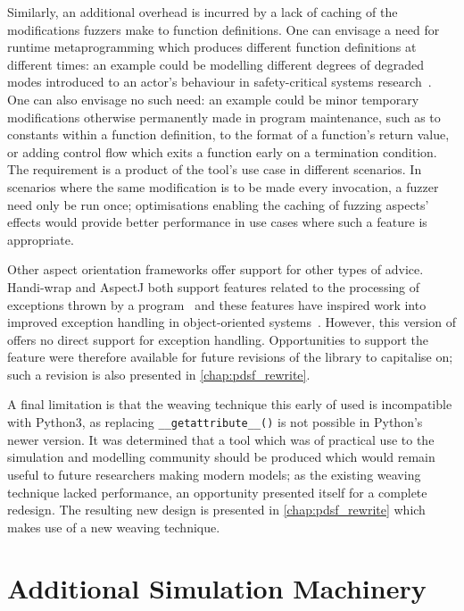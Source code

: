 Similarly, an additional overhead is incurred by a lack of caching of the
modifications fuzzers make to function definitions. One can envisage a need for
runtime metaprogramming which produces different function definitions at
different times: an example could be modelling different degrees of degraded
modes introduced to an actor's behaviour in safety-critical systems
research~\cite{johnson2007degradedmodes}. One can also envisage no such need: an
example could be minor temporary modifications otherwise permanently made in
program maintenance, such as to constants within a function definition, to the
format of a function's return value, or adding control flow which exits a
function early on a termination condition. The requirement is a product of the
tool's use case in different scenarios. In scenarios where the same modification
is to be made every invocation, a fuzzer need only be run once; optimisations
enabling the caching of fuzzing aspects' effects would provide better
performance in use cases where such a feature is appropriate.

Other aspect orientation frameworks offer support for other types of advice.
Handi-wrap and AspectJ both support features related to the processing of
exceptions thrown by a program~\cite{Baker_2002,aspectj_intro} and these
features have inspired work into improved exception handling in object-oriented
systems~\cite{millham2011aopandoopsecurity}. However, this version of \pdsf
offers no direct support for exception handling. Opportunities to support the
feature were therefore available for future revisions of the library to
capitalise on; such a revision is also presented in \cref{chap:pdsf_rewrite}.

A final limitation is that the weaving technique this early of \pdsf used is
incompatible with Python3, as replacing \lstinline{__getattribute__()} is not
possible in Python's newer version. It was determined that a tool which was of
practical use to the simulation and modelling community should be produced which
would remain useful to future researchers making modern models; as the existing
weaving technique lacked performance, an opportunity presented itself for a
complete redesign. The resulting new design is presented in
\cref{chap:pdsf_rewrite} which makes use of a new weaving technique.



\section{Additional Simulation Machinery}\label{sec:prior_work_machinery}

